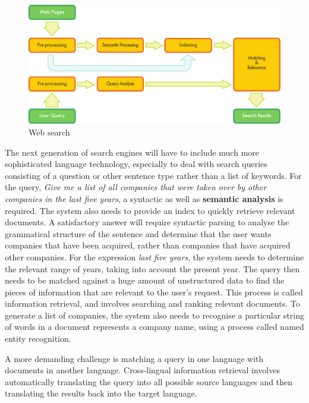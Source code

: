 {\begin{multicols}{2}
\begin{figure}[htb]
  \center
  \includegraphics[width=\textwidth]{../_media/english/web_search_architecture}
  \caption{Web search}
  \label{fig:websearcharch_en}
 \end{figure}


The next generation of search engines will have to include much more sophisticated language technology, especially to deal with search queries consisting of a question or other sentence type rather than a list of keywords. For the query, \textit{Give me a list of all companies that were taken over by other companies in the last five years}, a syntactic as well as \textbf{semantic analysis} is required. The system also needs to provide an index to quickly retrieve relevant documents. A satisfactory answer will require syntactic parsing to analyse the grammatical structure of the sentence and determine that the user wants companies that have been acquired, rather than companies that have acquired other companies. For the expression \textit{last five years}, the system needs to determine the relevant range of years, taking into account the present year. The query then needs to be matched against a huge amount of unstructured data to find the pieces of information that are relevant to the user’s request. This process is called information retrieval, and involves searching and ranking relevant documents. To generate a list of companies, the system also needs to recognise a particular string of words in a document represents a company name, using a process called named entity recognition. 

A more demanding challenge is matching a query in one language with documents in another language. Cross-lingual information retrieval involves automatically translating the query into all possible source languages and then translating the results back into the target language. 


\end{multicols}}
